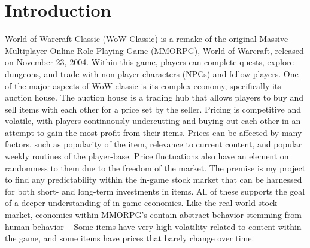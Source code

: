 \documentclass[sigconf]{acmart}
\begin{document}

%

%
\maketitle

\section{Introduction}
World of Warcraft Classic (WoW Classic) is a remake of the original Massive Multiplayer Online Role-Playing Game (MMORPG), World of Warcraft, released on November 23, 2004. Within this game, players can complete quests, explore dungeons, and trade with non-player characters (NPCs) and fellow players. One of the major aspects of WoW classic is its complex economy, specifically its auction house. The auction house is a trading hub that allows players to buy and sell items with each other for a price set by the seller. Pricing is competitive and volatile, with players continuously undercutting and buying out each other in an attempt to gain the most profit from their items. Prices can be affected by many factors, such as popularity of the item, relevance to current content, and popular weekly routines of the player-base. Price fluctuations also have an element on randomness to them due to the freedom of the market.
	The premise is my project to find any predictability within the in-game stock market that can be harnessed for both short- and long-term investments in items. All of these supports the goal of a deeper understanding of in-game economies. Like the real-world stock market, economies within MMORPG’s contain abstract behavior stemming from human behavior – Some items have very high volatility related to content within the game, and some items have prices that barely change over time. 
\end{document}
